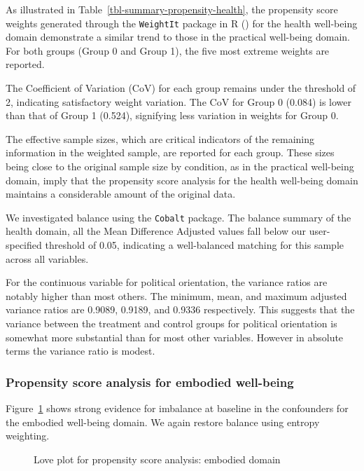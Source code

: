 \documentclass[
  singlecolumn,
  9pt]{article}
\begin{document}
As illustrated in Table~\ref{tbl-summary-propensity-health}, the
propensity score weights generated through the \texttt{WeightIt} package
in R () for the
health well-being domain demonstrate a similar trend to those in the
practical well-being domain. For both groups (Group 0 and Group 1), the
five most extreme weights are reported.

The Coefficient of Variation (CoV) for each group remains under the
threshold of 2, indicating satisfactory weight variation. The CoV for
Group 0 (0.084) is lower than that of Group 1 (0.524), signifying less
variation in weights for Group 0.

The effective sample sizes, which are critical indicators of the
remaining information in the weighted sample, are reported for each
group. These sizes being close to the original sample size by condition,
as in the practical well-being domain, imply that the propensity score
analysis for the health well-being domain maintains a considerable
amount of the original data.

We investigated balance using the \texttt{Cobalt} package. The balance
summary of the health domain, all the Mean Difference Adjusted values
fall below our user-specified threshold of 0.05, indicating a
well-balanced matching for this sample across all variables.

For the continuous variable for political orientation, the variance
ratios are notably higher than most others. The minimum, mean, and
maximum adjusted variance ratios are 0.9089, 0.9189, and 0.9336
respectively. This suggests that the variance between the treatment and
control groups for political orientation is somewhat more substantial
than for most other variables. However in absolute terms the variance
ratio is modest.

\subsubsection{Propensity score analysis for embodied
well-being}\label{propensity-score-analysis-for-embodied-well-being}

Figure~\ref{fig-love-embodied} shows strong evidence for imbalance at
baseline in the confounders for the embodied well-being domain. We again
restore balance using entropy weighting.

\begin{figure}


\caption{\label{fig-love-embodied}Love plot for propensity score
analysis: embodied domain}

\end{figure}%
\end{document}
